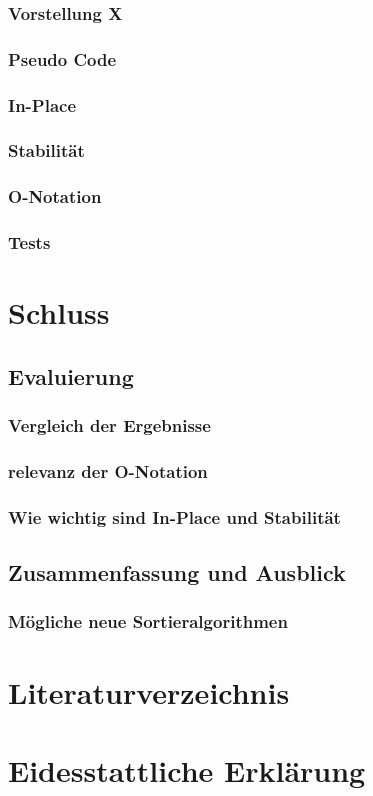 \documentclass{article}
\begin{document}
\subsubsection{Vorstellung X}
\subsubsection{Pseudo Code}
\subsubsection{In-Place}
\subsubsection{Stabilität}
\subsubsection{O-Notation}
\subsubsection{Tests} %


\section{Schluss}
\subsection{Evaluierung}
\subsubsection{Vergleich der Ergebnisse}
\subsubsection{relevanz der O-Notation}
\subsubsection{Wie wichtig sind In-Place und Stabilität}

\subsection{Zusammenfassung und Ausblick}
\subsubsection{Mögliche neue Sortieralgorithmen}

\section{Literaturverzeichnis}

\section{Eidesstattliche Erklärung}
\end{document}
